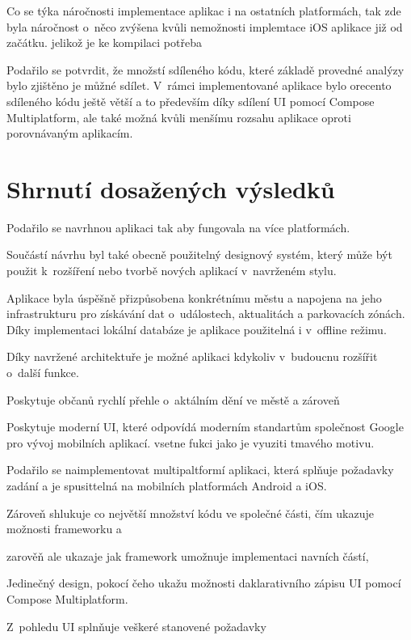 Co se týka náročnosti implementace aplikac i na ostatních platformách, tak zde byla náročnost
o~něco zvýšena kvůli nemožnosti implemtace iOS aplikace již od začátku. jelikož je ke kompilaci potřeba 


Podařilo se potvrdit, že množstí sdíleného kódu, které základě provedné analýzy bylo zjištěno je můžné sdílet. V~rámci implementované aplikace
bylo orecento sdíleného kódu ještě větší a to především díky sdílení UI pomocí Compose Multiplatform, ale také možná kvůli menšímu rozsahu
aplikace oproti porovnávaným aplikacím. 




\section{Shrnutí dosažených výsledků}
Podařilo se navrhnou aplikaci tak aby fungovala na více platformách.

Součástí návrhu byl také obecně použitelný designový systém, který může být použit k~rozšíření nebo tvorbě nových aplikací v~navrženém stylu.

Aplikace byla úspěšně přizpůsobena konkrétnímu městu a napojena na jeho infrastrukturu pro získávání dat o~událostech, 
aktualitách a parkovacích zónách. Díky implementaci lokální databáze je aplikace použitelná i v~offline režimu.

Díky navržené architektuře je možné aplikaci kdykoliv v~budoucnu rozšířit o~další funkce. 

Poskytuje občanů rychlí přehle o~aktálním dění ve městě a zároveň 

Poskytuje moderní UI, které odpovídá moderním standartům společnost Google pro vývoj mobilních aplikací.
vsetne fukci jako je vyuziti tmavého motivu.

Podařilo se naimplementovat multipaltformí aplikaci, která splňuje požadavky zadání a je spusittelná na mobilních 
platformách Android a iOS. 

Zároveň shlukuje co největší množství kódu ve společné části, čím ukazuje možnosti frameworku a 

zarověň ale ukazaje jak framework umožnuje implementaci navních částí, 

Jedinečný design, pokocí čeho ukažu možnosti daklarativního zápisu UI pomocí Compose Multiplatform.

Z~pohledu UI splnňuje veškeré stanovené požadavky

